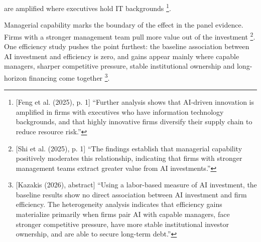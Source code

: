 are amplified where executives hold IT backgrounds \parencite[p.~1]{feng2025algorithms}\footnote{[Feng et al. (2025), p. 1] ``Further analysis shows that AI-driven innovation is amplified in firms with executives who have information technology backgrounds, and that highly innovative firms diversify their supply chain to reduce resource risk.''}.

Managerial capability marks the boundary of the effect in the panel evidence. Firms with a stronger management team pull more value out of the investment \parencite[p.~1]{shi2025value}\footnote{[Shi et al. (2025), p. 1] ``The findings establish that managerial capability positively moderates this relationship, indicating that firms with stronger management teams extract greater value from AI investments.''}. One efficiency study pushes the point furthest: the baseline association between AI investment and efficiency is zero, and gains appear mainly where capable managers, sharper competitive pressure, stable institutional ownership and long-horizon financing come together \parencite[abstract]{kazakis2026conditional}\footnote{[Kazakis (2026), abstract] ``Using a labor-based measure of AI investment, the baseline results show no direct association between AI investment and firm efficiency. The heterogeneity analysis indicates that efficiency gains materialize primarily when firms pair AI with capable managers, face stronger competitive pressure, have more stable institutional investor ownership, and are able to secure long-term debt.''}.

